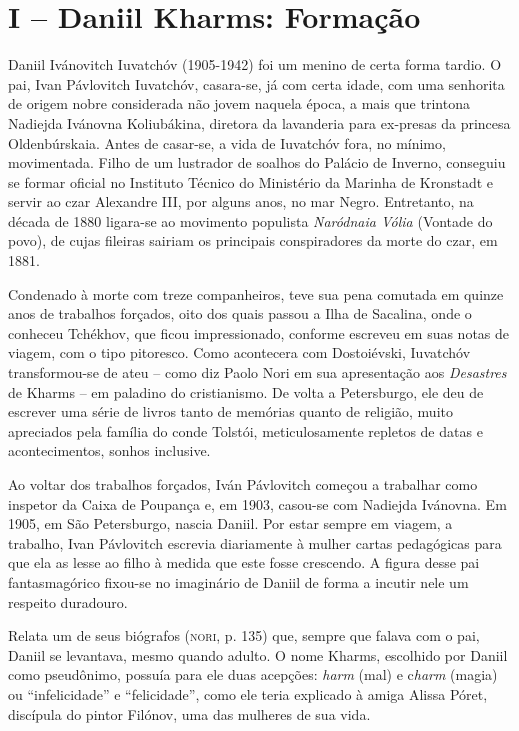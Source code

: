 \section{I -- Daniil Kharms: Formação}

Daniil Ivánovitch Iuvatchóv (1905-1942) foi um menino de certa forma
tardio. O pai, Ivan Pávlovitch Iuvatchóv, casara-se, já com certa idade,
com uma senhorita de origem nobre considerada não jovem naquela época, a
mais que trintona Nadiejda Ivánovna Koliubákina, diretora da lavanderia
para ex-presas da princesa Oldenbúrskaia. Antes de casar-se, a vida de
Iuvatchóv fora, no mínimo, movimentada. Filho de um lustrador de soalhos
do Palácio de Inverno, conseguiu se formar oficial no Instituto Técnico
do Ministério da Marinha de Kronstadt e servir ao czar Alexandre III,
por alguns anos, no mar Negro. Entretanto, na década de 1880 ligara-se
ao movimento populista \emph{Naródnaia Vólia} (Vontade do povo), de
cujas fileiras sairiam os principais conspiradores da morte do czar, em
1881.

Condenado à morte com treze companheiros, teve sua pena comutada em
quinze anos de trabalhos forçados, oito dos quais passou a Ilha de
Sacalina, onde o conheceu Tchékhov, que ficou impressionado, conforme
escreveu em suas notas de viagem, com o tipo pitoresco. Como acontecera
com Dostoiévski, Iuvatchóv transformou-se de ateu -- como diz Paolo Nori
em sua apresentação aos \emph{Desastres} de Kharms -- em paladino do
cristianismo. De volta a Petersburgo, ele deu de escrever uma série de
livros tanto de memórias quanto de religião, muito apreciados pela
família do conde Tolstói, meticulosamente repletos de datas e
acontecimentos, sonhos inclusive.

Ao voltar dos trabalhos forçados, Iván Pávlovitch começou a trabalhar
como inspetor da Caixa de Poupança e, em 1903, casou-se com Nadiejda
Ivánovna. Em 1905, em São Petersburgo, nascia Daniil. Por estar sempre
em viagem, a trabalho, Ivan Pávlovitch escrevia diariamente à mulher
cartas pedagógicas para que ela as lesse ao filho à medida que este
fosse crescendo. A figura desse pai fantasmagórico fixou-se no
imaginário de Daniil de forma a incutir nele um respeito duradouro.

Relata um de seus biógrafos (\textsc{nori}, p. 135) que, sempre que
falava com o pai, Daniil se levantava, mesmo quando adulto. O nome
Kharms, escolhido por Daniil como pseudônimo, possuía para ele duas
acepções: \emph{harm} (mal) e c\emph{harm} (magia) ou ``infelicidade'' e
``felicidade'', como ele teria explicado à amiga Alissa Póret, discípula
do pintor Filónov, uma das mulheres de sua vida.

